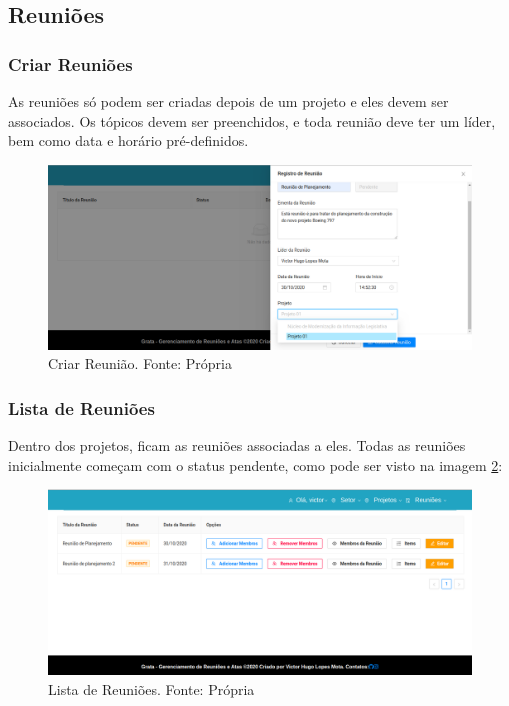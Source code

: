 \subsection{Reuniões}

\subsubsection{Criar Reuniões}

As reuniões só podem ser criadas depois de um projeto e eles devem ser associados. Os tópicos devem ser preenchidos, e toda reunião deve ter um líder, bem como data e horário pré-definidos. 

\begin{figure}[H]
    \centering
    \includegraphics[width=1.0\textwidth]{figuras/criar_reuniao.png}
    \caption{Criar Reunião. Fonte: Própria}
    \label{img:criar_reuniao}
\end{figure}

\subsubsection{Lista de Reuniões}

Dentro dos projetos, ficam as reuniões associadas a eles. Todas as reuniões inicialmente começam com o status pendente, como pode ser visto na imagem \ref{img:lista_de_reunioes}:

\begin{figure}[H]
    \centering
    \includegraphics[width=1.0\textwidth]{figuras/lista_reunioes.png}
    \caption{Lista de Reuniões. Fonte: Própria}
    \label{img:lista_de_reunioes}
\end{figure}

